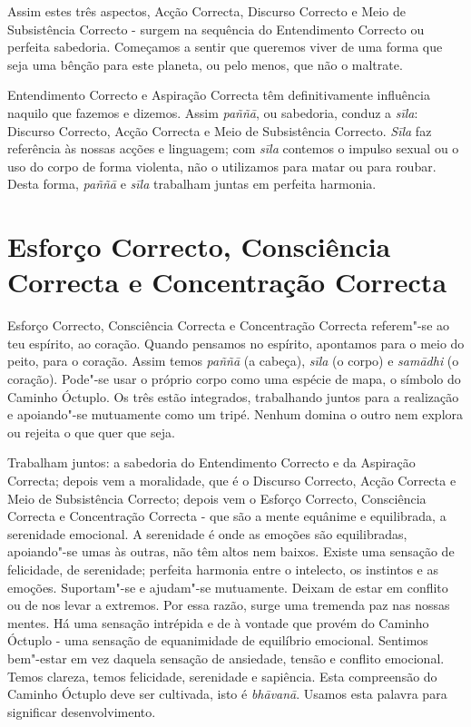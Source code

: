 Assim estes três aspectos, Acção Correcta, Discurso Correcto e Meio de Subsistência
Correcto - surgem na sequência do Entendimento Correcto ou perfeita sabedoria.
Começamos a sentir que queremos viver de uma forma que seja uma bênção para este
planeta, ou pelo menos, que não o maltrate.

Entendimento Correcto e Aspiração Correcta têm definitivamente influência
naquilo que fazemos e dizemos. Assim \emph{paññā}, ou sabedoria, conduz a
\emph{sīla}: Discurso Correcto, Acção Correcta e Meio de Subsistência Correcto.
\emph{Sīla} faz referência às nossas acções e linguagem; com \emph{sīla}
contemos o impulso sexual ou o uso do corpo de forma violenta, não o utilizamos
para matar ou para roubar. Desta forma, \emph{paññā} e \emph{sīla} trabalham
juntas em perfeita harmonia.

\section{Esforço Correcto, Consciência Correcta e Concentração Correcta}

Esforço Correcto, Consciência Correcta e Concentração Correcta referem"-se ao teu
espírito, ao coração. Quando pensamos no espírito, apontamos para o meio do
peito, para o coração. Assim temos \emph{paññā} (a cabeça), \emph{sīla} (o
corpo) e \emph{samādhi} (o coração). Pode"-se usar o próprio corpo como uma
espécie de mapa, o símbolo do Caminho Óctuplo. Os três estão integrados,
trabalhando juntos para a realização e apoiando"-se mutuamente como um tripé.
Nenhum domina o outro nem explora ou rejeita o que quer que seja.

Trabalham juntos: a sabedoria do Entendimento Correcto e da Aspiração Correcta;
depois vem a moralidade, que é o Discurso Correcto, Acção Correcta e Meio de
Subsistência Correcto; depois vem o Esforço Correcto, Consciência Correcta e Concentração
Correcta - que são a mente equânime e equilibrada, a serenidade emocional. A
serenidade é onde as emoções são equilibradas, apoiando"-se umas às outras, não
têm altos nem baixos. Existe uma sensação de felicidade, de serenidade; perfeita
harmonia entre o intelecto, os instintos e as emoções. Suportam"-se e ajudam"-se
mutuamente. Deixam de estar em conflito ou de nos levar a extremos. Por essa
razão, surge uma tremenda paz nas nossas mentes. Há uma sensação intrépida e de
à vontade que provém do Caminho Óctuplo - uma sensação de equanimidade de
equilíbrio emocional. Sentimos bem"-estar em vez daquela sensação de ansiedade,
tensão e conflito emocional. Temos clareza, temos felicidade, serenidade e sapiência.
Esta compreensão do Caminho Óctuplo deve ser cultivada, isto é \emph{bhāvanā}.
Usamos esta palavra para significar desenvolvimento.

